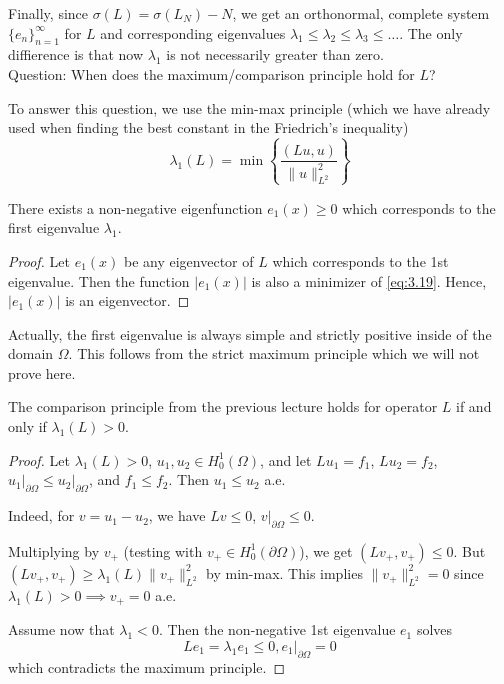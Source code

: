 \documentclass{report}
\begin{document}
Finally, since \(\sigma(L) = \sigma(L_{N}) - N\), we get an orthonormal, complete system \(\{e_{n}\}_{n=1}^{\infty}\) for \(L\) and corresponding eigenvalues \(\lambda_{1} \leq \lambda_{2} \leq \lambda_{3} \leq \dots\). The only diffierence is that now \(\lambda_{1}\) is not necessarily greater than zero. \\

Question: When does the maximum/comparison principle hold for \(L\)?

To answer this question, we use the min-max principle (which we have already used when finding the best constant in the Friedrich's inequality)
\begin{equation}\label{eq:3.19}
    \lambda_{1}(L) = \min\left\{\frac{(Lu, u)}{\|u\|^{2}_{L^{2}}}\right\}
\end{equation}

\begin{corollary}{}{}
    There exists a non-negative eigenfunction \(e_{1}(x) \geq 0\) which corresponds to the first eigenvalue \(\lambda_{1}\).
\end{corollary}

\begin{proof}
    Let \(e_{1}(x)\) be any eigenvector of \(L\) which corresponds to the 1st eigenvalue. Then the function \(\vert e_{1}(x) \vert \) is also a minimizer of \ref{eq:3.19}. Hence, \(\vert e_{1}(x) \vert \) is an eigenvector.
\end{proof}

\begin{note}
    Actually, the first eigenvalue is always simple and strictly positive inside of the domain \(\Omega\). This follows from the strict maximum principle which we will not prove here.
\end{note}

\begin{theorem}{}{}
    The comparison principle from the previous lecture holds for operator \(L\) if and only if \(\lambda_{1}(L) > 0\).
\end{theorem}

\begin{proof}
    Let \(\lambda_{1}(L) > 0\), \(u_{1}, u_{2} \in H^{1}_{0}(\Omega)\), and let \(Lu_{1} = f_{1}\), \(Lu_{2} = f_{2}\), \(\left. u_{1} \right|_{\partial \Omega} \leq \left. u_{2} \right|_{\partial \Omega}\), and \(f_{1} \leq f_{2}\). Then \(u_{1} \leq u_{2}\) a.e. 

    Indeed, for \(v = u_{1} - u_{2}\), we have \(Lv \leq 0\), \(\left. v \right|_{\partial \Omega} \leq 0\). 

    Multiplying by \(v_{+}\) (testing with \(v_{+} \in H^{1}_{0}(\partial \Omega)\)), we get \((Lv_{+}, v_{+}) \leq 0\). 
    But \((Lv_{+}, v_{+}) \geq \lambda_{1}(L)\|v_{+}\|_{L^{2}}^{2}\) by min-max. This implies \(\|v_{+}\|_{L^{2}}^{2} = 0\) since \(\lambda_{1}(L) > 0 \implies v_{+} = 0\) a.e. 
    
    Assume now that \(\lambda_{1} < 0\). Then the non-negative 1st eigenvalue \(e_{1}\) solves
    \[
        Le_{1} = \lambda_{1}e_{1} \leq 0, \left. e_{1} \right|_{\partial \Omega} = 0
    \]
    which contradicts the maximum principle.
\end{proof}
\end{document}
